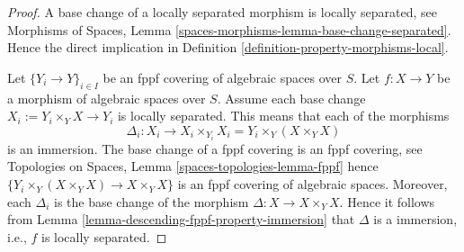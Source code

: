 \begin{proof}
A base change of a locally separated morphism is locally separated, see
Morphisms of Spaces,
Lemma \ref{spaces-morphisms-lemma-base-change-separated}.
Hence the direct implication in
Definition \ref{definition-property-morphisms-local}.

\medskip\noindent
Let $\{Y_i \to Y\}_{i \in I}$ be an fppf covering of algebraic spaces over $S$.
Let $f : X \to Y$ be a morphism of algebraic spaces over $S$.
Assume each base change $X_i := Y_i \times_Y X \to Y_i$ is locally separated.
This means that each of the morphisms
$$
\Delta_i :
X_i
\longrightarrow
X_i \times_{Y_i} X_i = Y_i \times_Y (X \times_Y X)
$$
is an immersion. The base change of a fppf covering is an
fppf covering, see
Topologies on Spaces, Lemma \ref{spaces-topologies-lemma-fppf}
hence $\{Y_i \times_Y (X \times_Y X) \to X \times_Y X\}$
is an fppf covering of algebraic spaces. Moreover, each
$\Delta_i$ is the base change of the morphism
$\Delta : X \to X \times_Y X$. Hence it follows from
Lemma \ref{lemma-descending-fppf-property-immersion}
that $\Delta$ is a immersion, i.e., $f$ is locally separated.
\end{proof}











